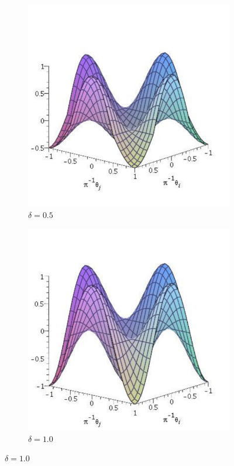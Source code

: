 \begin{figure}
\begin{subfigure}{0.5\textwidth }
    \includegraphics[width=\textwidth]{Figures/Vd5}
    \caption{$\delta = 0.5$}
\end{subfigure}    
%
\begin{subfigure}{0.5\textwidth }
    \centering
    \includegraphics[width=\textwidth]{Figures/Vd10}
    \caption{$\delta = 1.0$}
\end{subfigure}
%
\label{fig:Vd}
\end{figure}

